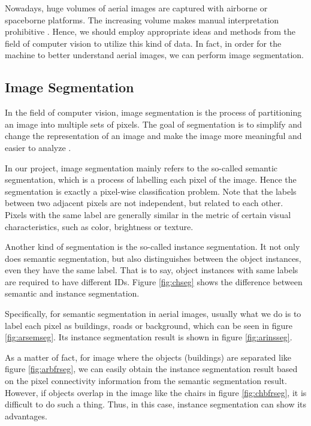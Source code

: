 Nowadays, huge volumes of aerial images are captured with airborne or spaceborne platforms. The increasing volume makes manual interpretation prohibitive \cite{mspascal}. Hence, we should employ appropriate ideas and methods from the field of computer vision to utilize this kind of data. In fact, in order for the machine to better understand aerial images, we can perform image segmentation.

\subsection{Image Segmentation}\label{imgseg}
In the field of computer vision, image segmentation is the process of partitioning an image into multiple sets of pixels. The goal of segmentation is to simplify and change the representation of an image and make the image more meaningful and easier to analyze \cite{cvbookstockman}.

In our project, image segmentation mainly refers to the so-called semantic segmentation, which is a process of labelling each pixel of the image. Hence the segmentation is exactly a pixel-wise classification problem. Note that the labels between two adjacent pixels are not independent, but related to each other. Pixels with the same label are generally similar in the metric of certain visual characteristics, such as color, brightness or texture.

Another kind of segmentation is the so-called instance segmentation. It not only does semantic segmentation, but also distinguishes between the object instances, even they have the same label. That is to say, object instances with same labels are required to have different IDs. Figure \ref{fig:chseg} shows the difference between semantic and instance segmentation.



Specifically, for semantic segmentation in aerial images, usually what we do is to label each pixel as buildings, roads or background, which can be seen in figure \ref{fig:arsemseg}. Its instance segmentation result is shown in figure \ref{fig:arinsseg}.



As a matter of fact, for image where the objects (buildings) are separated like figure \ref{fig:arbfrseg}, we can easily obtain the instance segmentation result based on the pixel connectivity information from the semantic segmentation result. However, if objects overlap in the image like the chairs in figure \ref{fig:chbfrseg}, it is difficult to do such a thing. Thus, in this case, instance segmentation can show its advantages.

